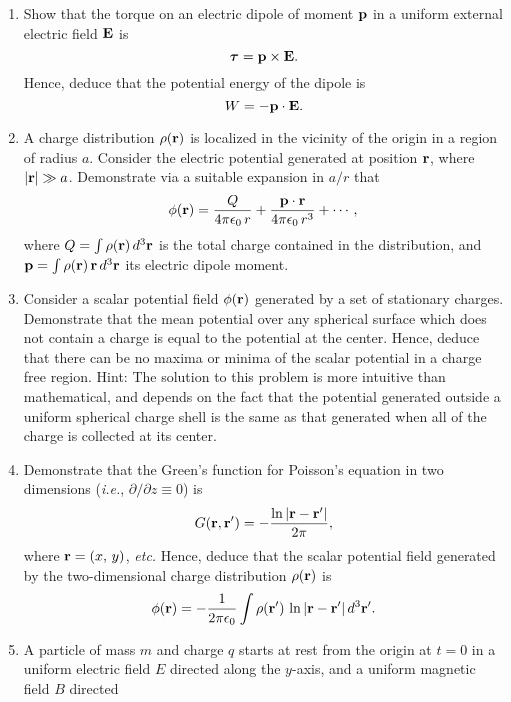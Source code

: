 {\begin{enumerate}
that the net force on the dipole can be written ${\bf f} = - \nabla W$, where
$$
W =- {\bf p}\cdot{\bf E}.
$$
Hence, show that the potential energy of an electric dipole of moment ${\bf p}_1$
in the electric field generated by a second dipole of moment ${\bf p}_2$ is
$$
W = \frac{r^2\,({\bf p}_1\cdot{\bf p}_2) - 3\,({\bf p}_1\cdot{\bf r})\,({\bf p}_2\cdot{\bf r})}{4\pi\epsilon_0\,r^5},
$$
where ${\bf r}$ is the displacement of one dipole from another.
\item Show that the torque on an electric dipole of moment ${\bf p}$ in a uniform
external electric field ${\bf E}$ is
$$
\mbox{\boldmath$\tau$} = {\bf p}\times {\bf E}.
$$
Hence, deduce that the potential energy of the dipole is
$$
W = -{\bf p}\cdot {\bf E}.
$$
\item A charge distribution $\rho({\bf r})$ is localized in the vicinity of the origin in a region of radius
$a$. Consider the electric potential generated at position ${\bf r}$, where
$|{\bf r}|\gg a$. Demonstrate via a suitable expansion in $a/r$ that
$$
\phi({\bf r}) = \frac{Q}{4\pi\epsilon_0\,r}+ \frac{{\bf p}\cdot{\bf r}}{4\pi\epsilon_0\,r^3} + \cdots,
$$
where $Q=\int \rho({\bf r})\,d^3{\bf r}$ is the total charge contained in the
distribution, and ${\bf p} = \int \rho({\bf r})\,{\bf r}\,d^3{\bf r}$ its electric
dipole moment.
\item Consider a scalar potential field $\phi({\bf r})$ generated by a set of stationary
charges. Demonstrate that the mean potential over any spherical surface which does
not contain a charge is equal to the potential at the center.
Hence, deduce that there can be no maxima or minima of the scalar potential
in a charge free region. Hint: The solution to this problem is more intuitive
than mathematical, and depends on the fact that the potential generated outside a uniform spherical charge shell is the same as that generated when
all of the charge is collected at its center.
\item Demonstrate that the Green's function for Poisson's equation in two
dimensions ({\em i.e.}, $\partial/\partial z\equiv 0$) is
$$
G({\bf r}, {\bf r}') = - \frac{\ln|{\bf r}-{\bf r}'|}{2\pi},
$$
where ${\bf r}= (x,\,y)$, {\em etc.}
Hence, deduce that the scalar potential field generated by the two-dimensional
charge distribution $\rho({\bf r})$ is
$$
\phi({\bf r}) = - \frac{1}{2\pi\epsilon_0}\int\rho({\bf r}')\,\ln|{\bf r}-{\bf r'}|\,d^3{\bf r}'.
$$
\item A particle of mass $m$ and charge  $q$ starts at rest from the origin at $t=0$ in a uniform electric
field $E$ directed along the $y$-axis, and a uniform magnetic field $B$ directed

\end{enumerate}}
